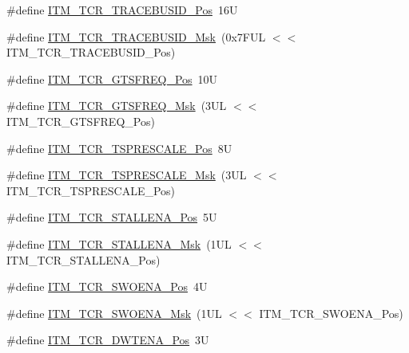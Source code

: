 \begin{DoxyCompactItemize}
\item 
\#define \mbox{\hyperlink{group___c_m_s_i_s___i_t_m_ga113bf41ed31584360ad7d865e5e0ace7}{I\+T\+M\+\_\+\+T\+C\+R\+\_\+\+T\+R\+A\+C\+E\+B\+U\+S\+I\+D\+\_\+\+Pos}}~16U
\item 
\#define \mbox{\hyperlink{group___c_m_s_i_s___i_t_m_gac014c7345304ed245b642eb9d6e9a302}{I\+T\+M\+\_\+\+T\+C\+R\+\_\+\+T\+R\+A\+C\+E\+B\+U\+S\+I\+D\+\_\+\+Msk}}~(0x7\+F\+U\+L $<$$<$ I\+T\+M\+\_\+\+T\+C\+R\+\_\+\+T\+R\+A\+C\+E\+B\+U\+S\+I\+D\+\_\+\+Pos)
\item 
\#define \mbox{\hyperlink{group___c_m_s_i_s___i_t_m_ga96c7c7cbc0d98426c408090b41f583f1}{I\+T\+M\+\_\+\+T\+C\+R\+\_\+\+G\+T\+S\+F\+R\+E\+Q\+\_\+\+Pos}}~10U
\item 
\#define \mbox{\hyperlink{group___c_m_s_i_s___i_t_m_gade862cf009827f7f6748fc44c541b067}{I\+T\+M\+\_\+\+T\+C\+R\+\_\+\+G\+T\+S\+F\+R\+E\+Q\+\_\+\+Msk}}~(3\+U\+L $<$$<$ I\+T\+M\+\_\+\+T\+C\+R\+\_\+\+G\+T\+S\+F\+R\+E\+Q\+\_\+\+Pos)
\item 
\#define \mbox{\hyperlink{group___c_m_s_i_s___i_t_m_gaa39e93e22d56e5e9edaf866b1171ac4f}{I\+T\+M\+\_\+\+T\+C\+R\+\_\+\+T\+S\+P\+R\+E\+S\+C\+A\+L\+E\+\_\+\+Pos}}~8U
\item 
\#define \mbox{\hyperlink{group___c_m_s_i_s___i_t_m_ga3e8651ecde89295bcc6e248a1b7393d6}{I\+T\+M\+\_\+\+T\+C\+R\+\_\+\+T\+S\+P\+R\+E\+S\+C\+A\+L\+E\+\_\+\+Msk}}~(3\+U\+L $<$$<$ I\+T\+M\+\_\+\+T\+C\+R\+\_\+\+T\+S\+P\+R\+E\+S\+C\+A\+L\+E\+\_\+\+Pos)
\item 
\#define \mbox{\hyperlink{group___c_m_s_i_s___i_t_m_gad74ca6140644b572eadbf21e870d24b9}{I\+T\+M\+\_\+\+T\+C\+R\+\_\+\+S\+T\+A\+L\+L\+E\+N\+A\+\_\+\+Pos}}~5U
\item 
\#define \mbox{\hyperlink{group___c_m_s_i_s___i_t_m_ga724f0560593042670b49e2f9a6483b6f}{I\+T\+M\+\_\+\+T\+C\+R\+\_\+\+S\+T\+A\+L\+L\+E\+N\+A\+\_\+\+Msk}}~(1\+U\+L $<$$<$ I\+T\+M\+\_\+\+T\+C\+R\+\_\+\+S\+T\+A\+L\+L\+E\+N\+A\+\_\+\+Pos)
\item 
\#define \mbox{\hyperlink{group___c_m_s_i_s___i_t_m_ga7a380f0c8078f6560051406583ecd6a5}{I\+T\+M\+\_\+\+T\+C\+R\+\_\+\+S\+W\+O\+E\+N\+A\+\_\+\+Pos}}~4U
\item 
\#define \mbox{\hyperlink{group___c_m_s_i_s___i_t_m_ga97476cb65bab16a328b35f81fd02010a}{I\+T\+M\+\_\+\+T\+C\+R\+\_\+\+S\+W\+O\+E\+N\+A\+\_\+\+Msk}}~(1\+U\+L $<$$<$ I\+T\+M\+\_\+\+T\+C\+R\+\_\+\+S\+W\+O\+E\+N\+A\+\_\+\+Pos)
\item 
\#define \mbox{\hyperlink{group___c_m_s_i_s___i_t_m_ga30e83ebb33aa766070fe3d1f27ae820e}{I\+T\+M\+\_\+\+T\+C\+R\+\_\+\+D\+W\+T\+E\+N\+A\+\_\+\+Pos}}~3U
$$
\end{DoxyCompactItemize}
